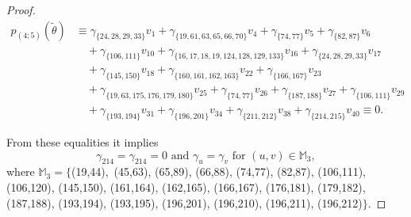 \documentclass[reqno]{amsart}
\theoremstyle{plain}
\theoremstyle{definition}
\theoremstyle{plain}
\theoremstyle{definition}
\numberwithin{equation}{section}
\begin{document}
\begin{proof}
\begin{align*}
p_{(4;5)}(\widetilde\theta) &\equiv \gamma_{\{24,28,29,33\}}v_{1} + \gamma_{\{19,61,63,65,66,70\}}v_{4} + \gamma_{\{74,77\}}v_{5} + \gamma_{\{82,87\}}v_{6}\\ 
&\quad + \gamma_{\{106,111\}}v_{10} + \gamma_{\{16,17,18,19,124,128,129,133\}}v_{16} + \gamma_{\{24,28,29,33\}}v_{17}\\ 
&\quad + \gamma_{\{145,150\}}v_{18} + \gamma_{\{160,161,162,163\}}v_{22} + \gamma_{\{166,167\}}v_{23}\\ 
&\quad + \gamma_{\{19,63,175,176,179,180\}}v_{25} + \gamma_{\{74,77\}}v_{26} + \gamma_{\{187,188\}}v_{27} + \gamma_{\{106,111\}}v_{29}\\ 
&\quad + \gamma_{\{193,194\}}v_{31} + \gamma_{\{196,201\}}v_{34} + \gamma_{\{211,212\}}v_{38} + \gamma_{\{214,215\}}v_{40} \equiv 0.
\end{align*}

From these equalities it implies
\begin{equation}\label{c63}
\gamma_{214} = \gamma_{214} = 0 \mbox{ and }  \gamma_u= \gamma_v \mbox{ for } (u,v) \in \mathbb M_3,
\end{equation}
where $\mathbb M_3 = \{$(19,44),\, (45,63), (65,89), (66,88), (74,77), (82,87), (106,111), (106,120), (145,150), (161,164), (162,165), (166,167), (176,181), (179,182), (187,188), (193,194), (193,195), (196,201), (196,210), (196,211), (196,212)$\}$.


\end{proof}
\end{document}
